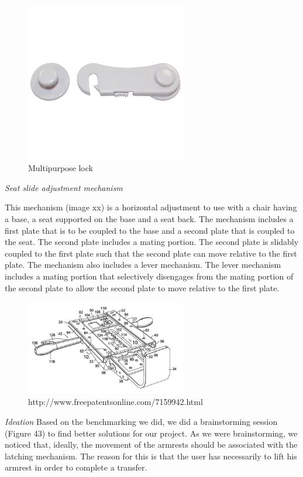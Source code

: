 \begin{figure}[h]
\centering
\includegraphics[width=7cm]{brazil_images/image044.png}
\caption{Multipurpose lock}
\label{fig:lock}
\end{figure}

\emph{Seat slide adjustment mechanism}

This mechanism (image xx) is a horizontal adjustment to use with a chair having a base, a seat supported on the base and a seat back. The mechanism includes a first plate that is to be coupled to the base and a second plate that is coupled to the seat. The second plate includes a mating portion. The second plate is slidably coupled to the first plate such that the second plate can move relative to the first plate. The mechanism also includes a lever mechanism. The lever mechanism includes a mating portion that selectively disengages from the mating portion of the second plate to allow the second plate to move relative to the first plate.

\begin{figure}[h]
\centering
\includegraphics[width=7cm]{brazil_images/image045.png}
\caption{http://www.freepatentsonline.com/7159942.html}
\label{fig:patent}
\end{figure}

\emph{Ideation}
Based on the benchmarking we did, we did a brainstorming session (Figure 43) to find better solutions for our project. As we were brainstorming, we noticed that, ideally, the movement of the armrests should be associated with the latching mechanism. The reason for this is that the user has necessarily to lift his armrest in order to complete a transfer. 


